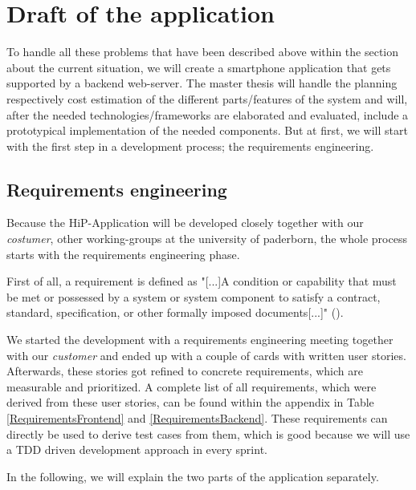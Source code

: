 \chapter[Draft of the application]{Draft of the application}
To handle all these problems that have been described above within the section about the current situation, we will create a smartphone application that gets supported by a backend web-server. The master thesis will handle the planning respectively cost estimation of the different parts/features of the system and will, after the needed technologies/frameworks are elaborated and evaluated, include a prototypical implementation of the needed components.
But at first, we will start with the first step in a development process; the requirements engineering.

\section{Requirements engineering}
Because the HiP-Application will be developed closely together with our \textit{costumer}, other working-groups at the university of paderborn, the whole process starts with the requirements engineering phase.

First of all, a requirement is defined as "[...]A condition or capability that must be met or possessed by a system or system component to satisfy a contract, standard, specification, or other formally imposed documents[...]" (\cite{IEEEReq}).

We started the development with a requirements engineering meeting together with our \textit{customer} and ended up with a couple of cards with written user stories. Afterwards, these stories got refined to concrete requirements, which are measurable and prioritized. A complete list of all requirements, which were derived from these user stories, can be found within the appendix in Table \ref{RequirementsFrontend} and \ref{RequirementsBackend}. These requirements can directly be used to derive test cases from them, which is good because we will use a \ac{TDD} driven development approach in every sprint. 

In the following, we will explain the two parts of the application separately.

